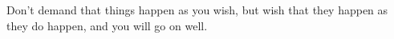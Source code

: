 Don't demand that things happen as you  wish, but wish that they happen as they
do happen, and you will go on well.
